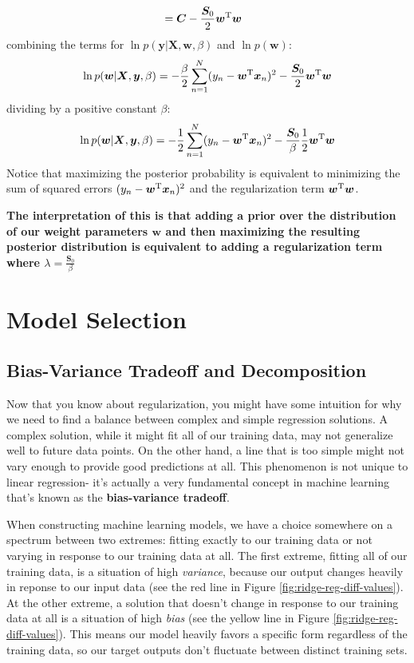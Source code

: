 \begin{derivation}
\begin{align*}
        &= \bm{C} -\frac{\boldsymbol{S}_0}{2} \bm{w}^{\mathrm T}\bm{w}
    \end{align*}
    combining the terms for $\ln{p(\bm{y}| \bm{X}, \bm{w}, \beta)}$ and $\ln{p(\bm{w})}$:
    \begin{align*}
        \ln{p(\bm{w}|\bm{X},\bm{y}, \beta)} = -\frac{\beta}{2}\sum_{n=1}^{N} (y_n - \bm{w}^{\mathrm T} \bm{x}_n)^2 - \frac{\boldsymbol{S}_0}{2} \bm{w}^{\mathrm T}\bm{w}
    \end{align*}
    dividing by a positive constant $\beta$:
    \begin{align*}
        \ln{p(\bm{w}|\bm{X},\bm{y}, \beta)} = -\frac{1}{2}\sum_{n=1}^{N} (y_n - \bm{w}^{\mathrm T} \bm{x}_n)^2 - \frac{\boldsymbol{S}_0}{\beta}\frac{1}{2} \bm{w}^{\mathrm T}\bm{w}
    \end{align*}
    Notice that maximizing the posterior probability is equivalent to minimizing the sum of squared errors $(y_n - \bm{w}^{\mathrm T} \bm{x}_n)^2$ and the regularization term $\bm{w}^{\mathrm T}\bm{w}$.
\end{derivation}

\textbf{The interpretation of this is that adding a prior over the distribution of our weight parameters $\bm{w}$ and then maximizing the resulting posterior distribution is equivalent to adding a regularization term where $\lambda = \frac{\boldsymbol{S}_0}{\beta}$}

\section{Model Selection}
\subsection{Bias-Variance Tradeoff and Decomposition}
Now that you know about regularization, you might have some intuition for why we need to find a balance between complex and simple regression solutions. A complex solution, while it might fit all of our training data, may not generalize well to future data points. On the other hand, a line that is too simple might not vary enough to provide good predictions at all. This phenomenon is not unique to linear regression- it's actually a very fundamental concept in machine learning that's known as the \textbf{bias-variance tradeoff}.

\begin{definition}
    When constructing machine learning models, we have a choice somewhere on a spectrum between two extremes: fitting exactly to our training data or not varying in response to our training data at all. The first extreme, fitting all of our training data, is a situation of high \textit{variance}, because our output changes heavily in reponse to our input data (see the red line in Figure \ref{fig:ridge-reg-diff-values}). At the other extreme, a solution that doesn't change in response to our training data at all is a situation of high \textit{bias} (see the yellow line in Figure \ref{fig:ridge-reg-diff-values}). This means our model heavily favors a specific form regardless of the training data, so our target outputs don't fluctuate between distinct training sets.
\end{definition}

